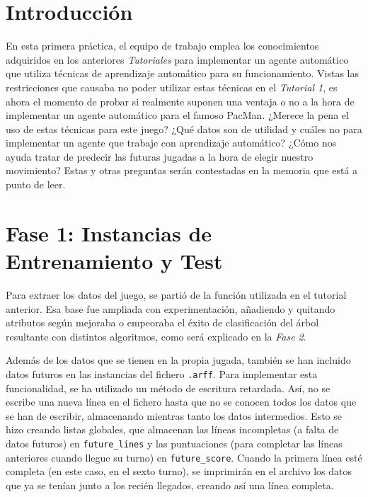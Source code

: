 \documentclass[12pt]{article}
\begin{document}
\tableofcontents

\newpage
\section*{Introducción}

En esta primera práctica, el equipo de trabajo emplea los conocimientos adquiridos en los anteriores \emph{Tutoriales} para implementar un agente automático que utiliza técnicas de aprendizaje automático para su funcionamiento. Vistas las restricciones que causaba no poder utilizar estas técnicas en el \emph{Tutorial 1}, es ahora el momento de probar si realmente suponen una ventaja o no a la hora de implementar un agente automático para el famoso PacMan. ¿Merece la pena el uso de estas técnicas para este juego? ¿Qué datos son de utilidad y cuáles no para implementar un agente que trabaje con aprendizaje automático? ¿Cómo nos ayuda tratar de predecir las futuras jugadas a la hora de elegir nuestro movimiento? Estas y otras preguntas serán contestadas en la memoria que está a punto de leer.

\newpage
\section{Fase 1: Instancias de Entrenamiento y Test}

Para extraer los datos del juego, se partió de la función utilizada en el tutorial anterior. Esa base fue ampliada con experimentación, añadiendo y quitando atributos según mejoraba o empeoraba el éxito de clasificación del árbol resultante con distintos algoritmos, como será explicado en la \emph{Fase 2}.

Además de los datos que se tienen en la propia jugada, también se han incluido datos futuros en las instancias del fichero \texttt{.arff}. Para implementar esta funcionalidad, se ha utilizado un método de escritura retardada. Así, no se escribe una nueva línea en el fichero hasta que no se conocen todos los datos que se han de escribir, almacenando mientras tanto los datos intermedios. Esto se hizo creando listas globales, que almacenan las líneas incompletas (a falta de datos futuros) en \texttt{future\_lines} y las puntuaciones (para completar las líneas anteriores cuando llegue su turno) en \texttt{future\_score}. Cuando la primera línea esté completa (en este caso, en el sexto turno), se imprimirán en el archivo los datos que ya se tenían junto a los recién llegados, creando así una línea completa.
\end{document}
